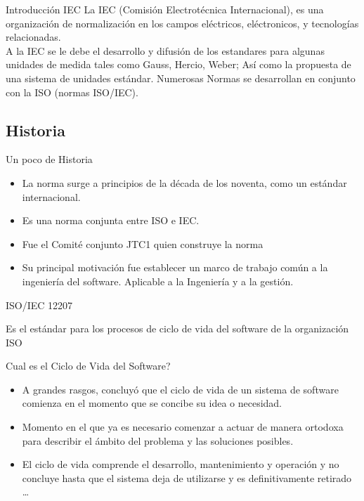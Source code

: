\documentclass{beamer}
\begin{document}
			\begin{frame}{Introducción IEC}
				La IEC (Comisión Electrotécnica Internacional), es una organización de normalización en los campos eléctricos, eléctronicos, y tecnologías relacionadas.\\ \smallskip
				A la IEC se le debe el desarrollo y difusión de los estandares para algunas unidades de medida tales como Gauss, Hercio, Weber; Así como la propuesta de una sistema de unidades estándar. Numerosas Normas se desarrollan en conjunto con la ISO (normas ISO/IEC).
			\end{frame}
			
			\subsection{Historia}
				\begin{frame}{Un poco de Historia}
					\begin{itemize}
						\item La norma surge a principios de la década de los noventa, como un estándar internacional.
						\item Es una norma conjunta entre ISO e IEC.
						\item Fue el Comité conjunto JTC1 quien construye la norma
						\item Su principal motivación fue establecer un marco de trabajo común a la ingeniería del software. Aplicable a la Ingeniería y a la gestión.
					\end{itemize}
				\end{frame}
				
				\begin{frame}{ISO/IEC 12207}
					\begin{definition}
						Es el estándar para los procesos de ciclo de vida del software de la organización ISO
					
					\end{definition}
				\end{frame}
				
				\begin{frame}
				\begin{center}
					\begin{center}
						{\huge Cual es el Ciclo de Vida del Software?}
					\end{center}
					
					\begin{itemize}
					\pause
						\item A grandes rasgos, concluyó que el ciclo de vida de un sistema de software comienza en el momento que se concibe su idea o necesidad.\pause
						\item Momento en el que ya es necesario comenzar a actuar de manera ortodoxa para describir el ámbito del problema y las soluciones posibles.\pause
						\item El ciclo de vida comprende el desarrollo, mantenimiento y operación y no concluye hasta que el sistema deja de utilizarse y es definitivamente retirado \ldots
					\end{itemize}
				\end{center}
			\end{frame}
			
\end{document}
